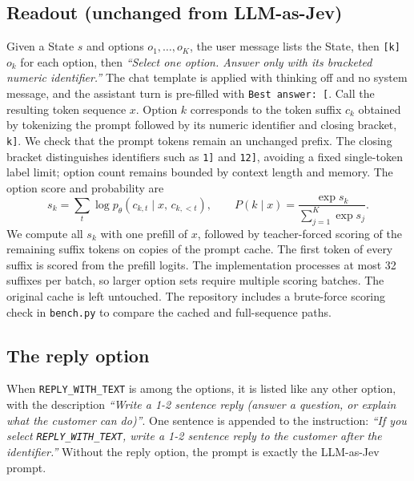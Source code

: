 \documentclass[11pt]{article}
\newcommand{\reply}{\texttt{REPLY\_WITH\_TEXT}}
\begin{document}
\subsection{Readout (unchanged from LLM-as-Jev)}
Given a State $s$ and options $o_1,\dots,o_K$, the user message lists the State, then \texttt{[k] $o_k$} for each option, then \emph{``Select one option. Answer only with its bracketed numeric identifier.''} The chat template is applied with thinking off and no system message, and the assistant turn is pre-filled with \texttt{Best answer: [}. Call the resulting token sequence $x$. Option $k$ corresponds to the token suffix $c_k$ obtained by tokenizing the prompt followed by its numeric identifier and closing bracket, \texttt{k]}. We check that the prompt tokens remain an unchanged prefix. The closing bracket distinguishes identifiers such as \texttt{1]} and \texttt{12]}, avoiding a fixed single-token label limit; option count remains bounded by context length and memory. The option score and probability are
\begin{equation}
s_k=\sum_{t}\log p_\theta\!\left(c_{k,t}\mid x,\,c_{k,<t}\right),\qquad
P(k\mid x)=\frac{\exp s_k}{\sum_{j=1}^{K}\exp s_j}.\label{eq:readout}
\end{equation}
We compute all $s_k$ with one prefill of $x$, followed by teacher-forced scoring of the remaining suffix tokens on copies of the prompt cache. The first token of every suffix is scored from the prefill logits. The implementation processes at most 32 suffixes per batch, so larger option sets require multiple scoring batches. The original cache is left untouched. The repository includes a brute-force scoring check in \texttt{bench.py} to compare the cached and full-sequence paths.

\subsection{The reply option}
When \reply{} is among the options, it is listed like any other option, with the description \emph{``Write a 1-2 sentence reply (answer a question, or explain what the customer can do)''}. One sentence is appended to the instruction: \emph{``If you select \reply{}, write a 1-2 sentence reply to the customer after the identifier.''} Without the reply option, the prompt is exactly the LLM-as-Jev prompt.
\end{document}

